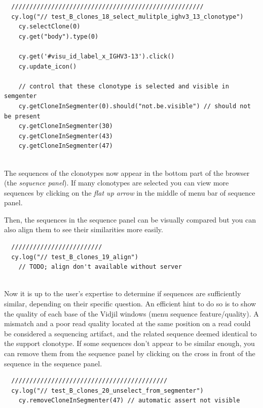 \begin{verbatim}
  /////////////////////////////////////////////////////
  cy.log("// test_B_clones_18_select_mulitple_ighv3_13_clonotype")
    cy.selectClone(0)
    cy.get("body").type(0)

    cy.get('#visu_id_label_x_IGHV3-13').click()
    cy.update_icon()

    // control that these clonotype is selected and visible in semgenter
    cy.getCloneInSegmenter(0).should("not.be.visible") // should not be present
    cy.getCloneInSegmenter(30)
    cy.getCloneInSegmenter(43)
    cy.getCloneInSegmenter(47)


\end{verbatim}

The sequences of the clonotypes now appear in the bottom part of the browser (the
\textit{sequence panel}). If many clonotypes are selected you can view more sequences
by clicking on the \textit{flat up arrow} in the middle of menu bar of sequence panel.
 
Then, the sequences in the sequence panel can be visually compared but you can also align
them to see their similarities more easily.


\begin{verbatim}
  /////////////////////////
  cy.log("// test_B_clones_19_align")
    // TODO; align don't available without server


\end{verbatim}

Now it is up to the user's expertise to determine if sequences are sufficiently
similar, depending on their specific question. 
An efficient hint to do so is to show the quality of each base of the Vidjil windows (menu sequence feature/quality). 
A mismatch and a poor read quality located at the same position on a read could be considered a sequencing artifact, and the related sequence deemed identical to the support clonotype.
If some sequences don't appear to be similar enough, you can remove
them from the sequence panel by clicking on the cross in front of the sequence in
the sequence panel.
\begin{verbatim}
  ///////////////////////////////////////////
  cy.log("// test_B_clones_20_unselect_from_segmenter")
    cy.removeCloneInSegmenter(47) // automatic assert not visible


\end{verbatim}

